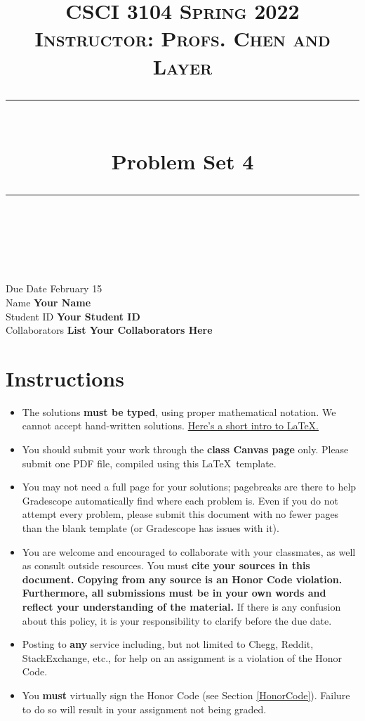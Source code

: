 \documentclass[11pt]{article}
\title{
\normalfont \normalsize 
\textsc{CSCI 3104 Spring 2022 \\ 
Instructor: Profs. Chen and Layer} \\
[10pt] 
\rule{\linewidth}{0.5pt} \\[6pt] 
\huge Problem Set 4 \\
\rule{\linewidth}{2pt}  \\[10pt]
}
\date{}
\theoremstyle{definition}
\theoremstyle{definition}
\theoremstyle{definition}
\begin{document}


\maketitle


\noindent
Due Date \dotfill February 15 \\
Name \dotfill \textbf{Your Name} \\
Student ID \dotfill \textbf{Your Student ID} \\
Collaborators \dotfill \textbf{List Your Collaborators Here}

\tableofcontents

\section{Instructions}
 \begin{itemize}
	\item The solutions \textbf{must be typed}, using proper mathematical notation. We cannot accept hand-written solutions. \href{http://ece.uprm.edu/~caceros/latex/introduction.pdf}{Here's a short intro to \LaTeX.}
	\item You should submit your work through the \textbf{class Canvas page} only. Please submit one PDF file, compiled using this \LaTeX \ template.
	\item You may not need a full page for your solutions; pagebreaks are there to help Gradescope automatically find where each problem is. Even if you do not attempt every problem, please submit this document with no fewer pages than the blank template (or Gradescope has issues with it).

	\item You are welcome and encouraged to collaborate with your classmates, as well as consult outside resources. You must \textbf{cite your sources in this document.} \textbf{Copying from any source is an Honor Code violation. Furthermore, all submissions must be in your own words and reflect your understanding of the material.} If there is any confusion about this policy, it is your responsibility to clarify before the due date. 

	\item Posting to \textbf{any} service including, but not limited to Chegg, Reddit, StackExchange, etc., for help on an assignment is a violation of the Honor Code.

	\item You \textbf{must} virtually sign the Honor Code (see Section \ref{HonorCode}). Failure to do so will result in your assignment not being graded.
\end{itemize}
\end{document}
